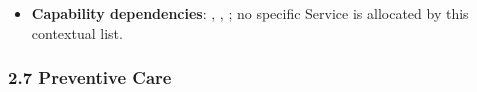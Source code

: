 \begin{itemize}
\begin{itemize}
\begin{itemize}
\item
\emph{Exposed Service}: \texttt{} — Exposes active allergy profiles to clinical decision support systems.



\end{itemize}


\end{itemize}


\item
\textbf{Capability dependencies}: \texttt{}, \texttt{}, \texttt{}; no specific Service is allocated by this contextual list.



\end{itemize}
\label{rad:sd:159}

\par\smallskip
{}\label{rad:sd:161}



\label{rad:sd:163}
\subsubsection*{2.7 Preventive Care}
\label{rad:sd:164}

